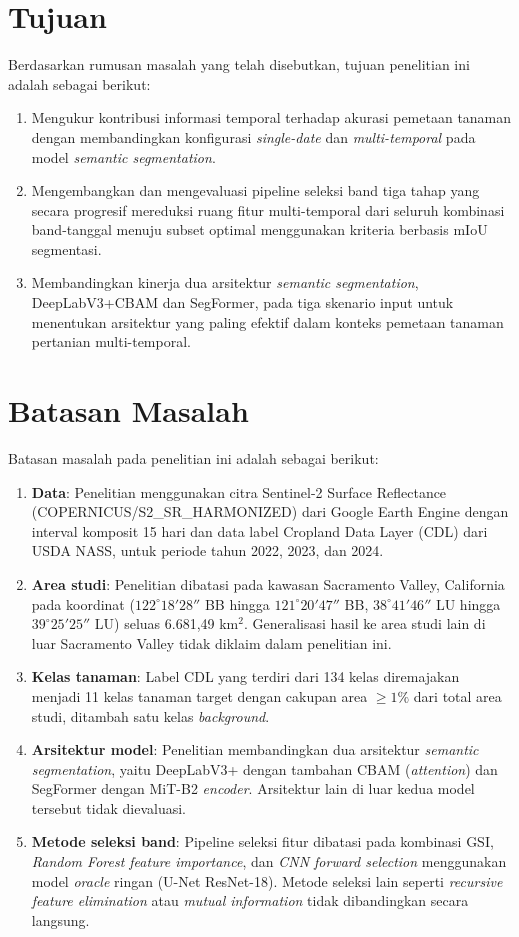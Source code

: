 \section{Tujuan}
Berdasarkan rumusan masalah yang telah disebutkan, tujuan penelitian ini adalah sebagai berikut:
\begin{enumerate}
    \item Mengukur kontribusi informasi temporal terhadap akurasi pemetaan tanaman dengan membandingkan konfigurasi \textit{single-date} dan \textit{multi-temporal} pada model \textit{semantic segmentation}.
    \item Mengembangkan dan mengevaluasi pipeline seleksi band tiga tahap yang secara progresif mereduksi ruang fitur multi-temporal dari seluruh kombinasi band-tanggal menuju subset optimal menggunakan kriteria berbasis mIoU segmentasi.
    \item Membandingkan kinerja dua arsitektur \textit{semantic segmentation}, DeepLabV3+CBAM dan SegFormer, pada tiga skenario input untuk menentukan arsitektur yang paling efektif dalam konteks pemetaan tanaman pertanian multi-temporal.
\end{enumerate}

\section{Batasan Masalah}
Batasan masalah pada penelitian ini adalah sebagai berikut:
\begin{enumerate}
    \item \textbf{Data}: Penelitian menggunakan citra Sentinel-2 Surface Reflectance (COPERNICUS/S2\_SR\_HARMONIZED) dari Google Earth Engine dengan interval komposit 15 hari dan data label Cropland Data Layer (CDL) dari USDA NASS, untuk periode tahun 2022, 2023, dan 2024.
    \item \textbf{Area studi}: Penelitian dibatasi pada kawasan Sacramento Valley, California pada koordinat ($122^{\circ}18'28''$ BB hingga $121^{\circ}20'47''$ BB, $38^{\circ}41'46''$ LU hingga $39^{\circ}25'25''$ LU) seluas 6.681,49 km$^2$. Generalisasi hasil ke area studi lain di luar Sacramento Valley tidak diklaim dalam penelitian ini.
    \item \textbf{Kelas tanaman}: Label CDL yang terdiri dari 134 kelas diremajakan menjadi 11 kelas tanaman target dengan cakupan area $\geq 1\%$ dari total area studi, ditambah satu kelas \textit{background}.
    \item \textbf{Arsitektur model}: Penelitian membandingkan dua arsitektur \textit{semantic segmentation}, yaitu DeepLabV3+ dengan tambahan CBAM (\textit{attention}) dan SegFormer dengan MiT-B2 \textit{encoder}. Arsitektur lain di luar kedua model tersebut tidak dievaluasi.
    \item \textbf{Metode seleksi band}: Pipeline seleksi fitur dibatasi pada kombinasi GSI, \textit{Random Forest feature importance}, dan \textit{CNN forward selection} menggunakan model \textit{oracle} ringan (U-Net ResNet-18). Metode seleksi lain seperti \textit{recursive feature elimination} atau \textit{mutual information} tidak dibandingkan secara langsung.
\end{enumerate}

